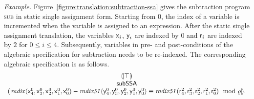 \noindent
\emph{Example.}
Figure~\ref{figure:translation:subtraction-ssa} gives the subtraction program
\textsc{sub} in static single assignment form. Starting from $0$, the
index of a variable is incremented when the variable is assigned to an
expression. After the static single assignment translation, the
variables $\mbox{\textsf{x}}_i$, $\mbox{\textsf{y}}_i$ are indexed by $0$ and
$\mbox{\textsf{r}}_i$ are indexed by $2$ for $0 \leq i \leq 4$. 
Subsequently, variables in pre- and post-conditions of the algebraic
specification for subtraction needs to be re-indexed. The
corresponding algebraic specification is as follows.
\[
\begin{array}{c}
{(\!|}{\top}{|\!)}\\
\mbox{\textsf{subSSA}}\\
{(\!|}{\mathit{radix}(\mbox{\textsf{x}}^0_4, \mbox{\textsf{x}}^0_3, \mbox{\textsf{x}}^0_2,
\mbox{\textsf{x}}^0_1, \mbox{\textsf{x}}^0_0) -
\mathit{radix51}(\mbox{\textsf{y}}^0_4, \mbox{\textsf{y}}^0_3, \mbox{\textsf{y}}^0_2,
\mbox{\textsf{y}}^0_1, \mbox{\textsf{y}}^0_0)
\equiv
\mathit{radix51}(\mbox{\textsf{r}}^2_4, \mbox{\textsf{r}}^2_3, \mbox{\textsf{r}}^2_2,
\mbox{\textsf{r}}^2_1, \mbox{\textsf{r}}^2_0)
\mod {\varrho}
}{|\!)}.
\end{array}
\]

